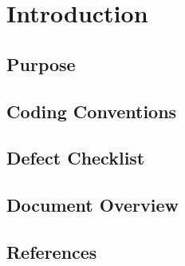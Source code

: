 \chapter{Introduction} \label{chap1}

\section{Purpose}

\section{Coding Conventions}

\section{Defect Checklist}

\section{Document Overview}

\section{References}
